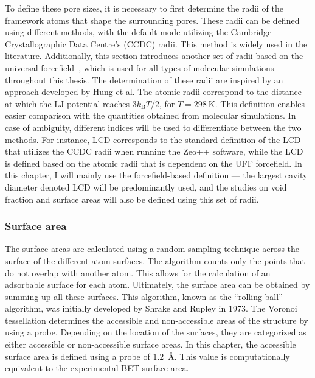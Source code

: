 \documentclass[main.tex]{subfiles}
\begin{document}
To define these pore sizes, it is necessary to first determine the radii of the framework atoms that shape the surrounding pores. These radii can be defined using different methods, with the default mode utilizing the Cambridge Crystallographic Data Centre's (CCDC) radii. This method is widely used in the literature. Additionally, this section introduces another set of radii based on the universal forcefield~\autocite{rappe1992}, which is used for all types of molecular simulations throughout this thesis. The determination of these radii are inspired by an approach developed by Hung et al.\autocite{Hung_2021} The atomic radii correspond to the distance at which the LJ potential reaches $3 k_\text{B} T/2$, for $T = \SI{298}{\kelvin}$. This definition enables easier comparison with the quantities obtained from molecular simulations. In case of ambiguity, different indices will be used to differentiate between the two methods. For instance, LCD corresponds to the standard definition of the LCD that utilizes the CCDC radii when running the Zeo++ software, while the LCD is defined based on the atomic radii that is dependent on the UFF forcefield. In this chapter, I will mainly use the forcefield-based definition --- the largest cavity diameter denoted LCD will be predominantly used, and the studies on void fraction and surface areas will also be defined using this set of radii.


\subsubsection{Surface area}

The surface areas are calculated using a random sampling technique across the surface of the different atom surfaces. The algorithm counts only the points that do not overlap with another atom. This allows for the calculation of an adsorbable surface for each atom. Ultimately, the surface area can be obtained by summing up all these surfaces. This algorithm, known as the ``rolling ball'' algorithm, was initially developed by Shrake and Rupley in 1973.\autocite{Shrake1973} The Voronoi tessellation determines the accessible and non-accessible areas of the structure by using a probe. Depending on the location of the surfaces, they are categorized as either accessible or non-accessible surface areas. In this chapter, the accessible surface area is defined using a probe of $1.2$~\si{\angstrom}. This value is computationally equivalent to the experimental  BET surface area.
\end{document}
